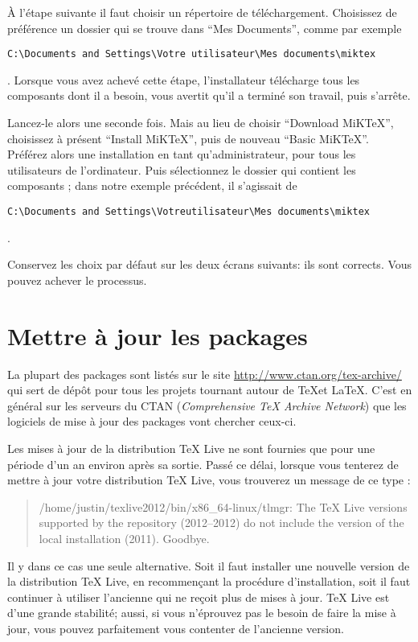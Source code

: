 À l'étape suivante il faut choisir un répertoire de téléchargement. Choisissez de préférence un dossier qui se trouve dans \enquote{Mes Documents}, comme par exemple \begin{english}\verb|C:\Documents and Settings\Votre utilisateur\Mes documents\miktex|\end{english}. Lorsque vous avez achevé cette étape, l'installateur télécharge tous les composants dont il a besoin, vous avertit qu'il a terminé son travail, puis s'arrête.

Lancez-le alors une seconde fois. Mais au lieu de choisir \enquote{Download MiKTeX}, choisissez à présent \enquote{Install MiKTeX}, puis de nouveau \enquote{Basic MiKTeX}. Préférez alors une installation en tant qu'administrateur, pour tous les utilisateurs de l'ordinateur. Puis sélectionnez le dossier qui contient les composants ; dans notre exemple précédent, il s'agissait de \begin{english}\verb|C:\Documents and Settings\Votreutilisateur\Mes documents\miktex|\end{english}.

Conservez les choix par défaut sur les deux écrans suivants: ils sont corrects. Vous pouvez achever le processus.







\section{Mettre à jour les packages}\label{maj}

La plupart des packages sont listés sur le site \url{http://www.ctan.org/tex-archive/} qui sert de dépôt pour tous les projets tournant autour de \TeX et \LaTeX. C'est  en général sur les serveurs du CTAN (\textenglish{\emph{Comprehensive TeX Archive Network}}) que les logiciels de mise à jour des packages vont chercher  ceux-ci.

\begin{attention}
    Les mises à jour de la distribution TeX Live ne sont fournies que pour une période d'un an environ après sa sortie. Passé ce délai, lorsque vous tenterez de mettre à jour votre distribution TeX Live, vous trouverez un message de ce type :

    \begin{quotation}
/home/justin/texlive2012/bin/x86\_64-linux/tlmgr: The TeX Live versions supported by the repository
  (2012--2012)
do not include the version of the local installation
  (2011).  Goodbye.
    \end{quotation}

Il y dans ce cas une seule alternative. Soit il faut installer une nouvelle version de la distribution TeX Live, en recommençant la procédure d'installation, soit il faut continuer à utiliser l'ancienne qui ne reçoit plus de mises à jour. TeX Live est d'une grande stabilité; aussi, si vous n'éprouvez pas le besoin de faire la mise à jour, vous pouvez parfaitement vous contenter de l'ancienne version.
\end{attention}

